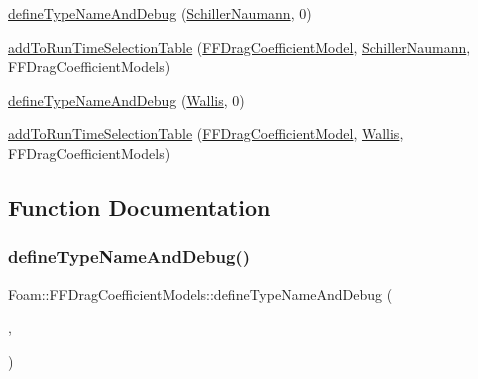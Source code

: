 \begin{DoxyCompactItemize}
\item 
\hyperlink{namespaceFoam_1_1FFDragCoefficientModels_a0e9b5a51cc3e2a08b0609c64016cbeb8}{define\+Type\+Name\+And\+Debug} (\hyperlink{classFoam_1_1FFDragCoefficientModels_1_1SchillerNaumann}{Schiller\+Naumann}, 0)
\item 
\hyperlink{namespaceFoam_1_1FFDragCoefficientModels_a18acc13c6cf5d893051ddda923c39948}{add\+To\+Run\+Time\+Selection\+Table} (\hyperlink{classFoam_1_1FFDragCoefficientModel}{F\+F\+Drag\+Coefficient\+Model}, \hyperlink{classFoam_1_1FFDragCoefficientModels_1_1SchillerNaumann}{Schiller\+Naumann}, F\+F\+Drag\+Coefficient\+Models)
\item 
\hyperlink{namespaceFoam_1_1FFDragCoefficientModels_aa5e4fb05d7496dce732305b764cd0a70}{define\+Type\+Name\+And\+Debug} (\hyperlink{classFoam_1_1FFDragCoefficientModels_1_1Wallis}{Wallis}, 0)
\item 
\hyperlink{namespaceFoam_1_1FFDragCoefficientModels_a9d0823d5b180c1699bb555873c34ba6e}{add\+To\+Run\+Time\+Selection\+Table} (\hyperlink{classFoam_1_1FFDragCoefficientModel}{F\+F\+Drag\+Coefficient\+Model}, \hyperlink{classFoam_1_1FFDragCoefficientModels_1_1Wallis}{Wallis}, F\+F\+Drag\+Coefficient\+Models)
\end{DoxyCompactItemize}


\subsection{Function Documentation}
\mbox{\label{namespaceFoam_1_1FFDragCoefficientModels_a030f2eadcf7c5de7923d223ef352b09f}} 
\subsubsection{\texorpdfstring{define\+Type\+Name\+And\+Debug()}{defineTypeNameAndDebug()}\hspace{0.1cm}{\footnotesize\ttfamily [1/6]}}
{\footnotesize\ttfamily Foam\+::\+F\+F\+Drag\+Coefficient\+Models\+::define\+Type\+Name\+And\+Debug (\begin{DoxyParamCaption}\item[{\hyperlink{classFoam_1_1FFDragCoefficientModels_1_1Autruffe}{Autruffe}}]{,  }\item[{0}]{ }\end{DoxyParamCaption})}

